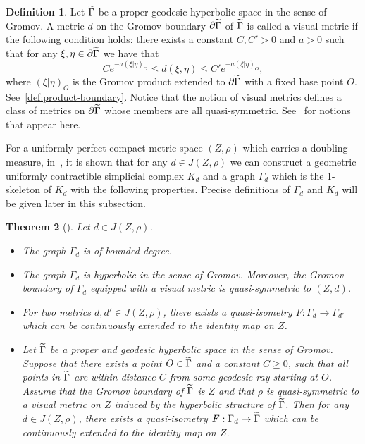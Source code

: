 \documentclass[10pt]{amsart}
\newtheorem{theo}{Theorem}[section]
\theoremstyle{definition}\newtheorem{defi}[theo]{Definition}\newtheorem{rema}[theo]{Remark}\newtheorem{exam}[theo]{Example}\newtheorem{exem}[theo]{Example}\newtheorem{nota}[theo]{Notation}
\let\oldtilde\tilde
\renewcommand*{\tilde}[1]{\mathchoice{\widetilde{#1}}{\widetilde{#1}}{\oldtilde{#1}}{\oldtilde{#1}}}
\begin{document}
\begin{defi}\label{df:visual}
Let $\tilde{\Gamma}$ be a proper geodesic hyperbolic space in the sense of Gromov. A metric $d$ on the Gromov boundary $\partial\tilde{\Gamma}$ of $\tilde{\Gamma}$ is called a visual metric if the following condition holds: there exists a constant $C,C'>0$ and $a>0$ such that for any $\xi,\eta\in\partial\tilde{\Gamma}$ we have that
\[
Ce^{-a(\xi|\eta)_O}\leq d(\xi,\eta)\leq C'e^{-a(\xi|\eta)_O},
\]
where $(\xi|\eta)_O$ is the Gromov product extended to $\partial\tilde{\Gamma}$ with a fixed base point $O$. See~\eqref{def:product-boundary}. Notice that the notion of visual metrics defines a class of metrics on $\partial\tilde{\Gamma}$ whose members are all quasi-symmetric. See~\cite{GH} for notions that appear here.
\end{defi}

For a uniformly perfect compact metric space $(Z,\rho)$ which carries a doubling measure, in~\cite{BP}, it is shown that for any $d\in J(Z,\rho)$ we can construct a geometric uniformly contractible simplicial complex $K_{d}$ and a graph $\Gamma_d$ which is the 1-skeleton of $K_d$ with the following properties. Precise definitions of $\Gamma_d$ and $K_d$ will be given later in this subsection.

\begin{theo}[{\cite[Proposition~2.1, Corollary~2.4.]{BP}}]\label{hf}
Let $d\in J(Z,\rho)$.
\begin{itemize}
\item The graph $\Gamma_{d}$ is of bounded degree.
\item The graph $\Gamma_{d}$ is hyperbolic in the sense of Gromov. Moreover, the Gromov boundary of $\Gamma_d$ equipped with a visual metric is quasi-symmetric to $(Z,d)$.
\item For two metrics $d,d'\in J(Z,\rho)$, there exists a quasi-isometry $F:\Gamma_{d}\rightarrow \Gamma_{d'}$ which can be continuously extended to the identity map on $Z$.
\item Let $\tilde{\Gamma}$ be a proper and geodesic hyperbolic space in the sense of Gromov. Suppose that there exists a point $O\in \tilde{\Gamma}$ and a constant $C\geq0$, such that all points in $\tilde{\Gamma}$ are within distance $C$ from some geodesic ray starting at $O$. Assume that the Gromov boundary of $\tilde{\Gamma}$ is $Z$ and that $\rho$ is quasi-symmetric to a visual metric on $Z$ induced by the hyperbolic structure of $\tilde{\Gamma}$. Then for any $d\in J(Z,\rho)$, there exists a quasi-isometry $F:\Gamma_{d}\rightarrow \tilde{\Gamma}$ which can be continuously extended to the identity map on $Z$.
\end{itemize}
\end{theo}
\end{document}
